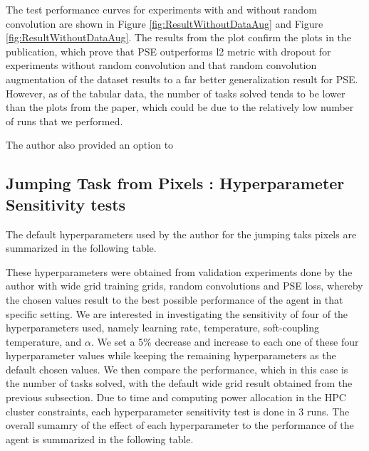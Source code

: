 \documentclass{usiinftr}
\begin{document}
The test performance curves for experiments with and without random convolution are shown in Figure \ref{fig:ResultWithoutDataAug} and Figure \ref{fig:ResultWithoutDataAug}. The results from the plot confirm the plots in the publication, which prove that PSE outperforms l2 metric with dropout for experiments without random convolution and that random convolution augmentation of the dataset results to a far better generalization result for PSE. However, as of the tabular data, the number of tasks solved tends to be lower than the plots from the paper, which could be due to the relatively low number of runs that we performed. 

The author also provided an option to 

\subsection{Jumping Task from Pixels : Hyperparameter Sensitivity tests}
The default hyperparameters used by the author for the jumping taks pixels are summarized in the following table. 

These hyperparameters were obtained from validation experiments done by the author with wide grid training grids, random convolutions and PSE loss, whereby the chosen values result to the best possible performance of the agent in that specific setting. We are interested in investigating the sensitivity of four of the hyperparameters used, namely learning rate, temperature, soft-coupling temperature, and $\alpha$. We set a 5\% decrease and increase to each one of these four hyperparameter values while keeping the remaining hyperparameters as the default chosen values. We then compare the performance, which in this case is the number of tasks solved, with the default wide grid result obtained from the previous subsection. Due to time and computing power allocation in the HPC cluster constraints, each hyperparameter sensitivity test is done in 3 runs. The overall sumamry of the effect of each hyperparameter to the performance of the agent is summarized in the following table.
\end{document}
